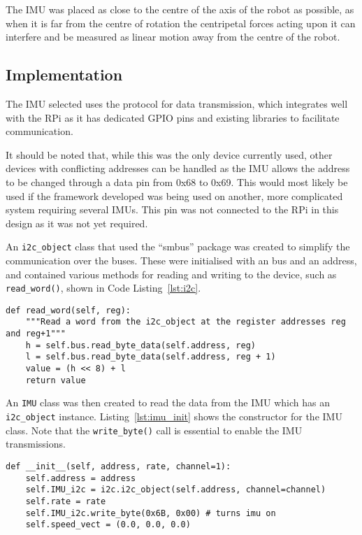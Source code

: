 The IMU was placed as close to the centre of the axis of the robot
as possible, as when it is far from the centre of rotation the centripetal
forces acting upon it can interfere and be measured as linear motion away
from the centre of the robot.

\subsection{Implementation}\label{elec/imu/impl}
The IMU selected uses the \isc{} protocol for data transmission, which
integrates well with the RPi as it has dedicated \isc{} GPIO pins and
existing libraries to facilitate communication.

It should be noted that, while this was the only \isc{} device currently
used, other devices with conflicting addresses can be handled as the IMU
allows the address to be changed through a data pin from 0x68 to 0x69.
This would most likely be used if the framework developed was being used
on another, more complicated system requiring several IMUs. This pin was
not connected to the RPi in this design as it was not yet required.

An \verb|i2c_object| class that used the ``smbus'' package was created to
simplify the communication over the \isc{} buses. These
were initialised with an \isc{} bus and an address, and
contained various methods for reading and writing to the \isc{} device,
such as \verb|read_word()|, shown in Code Listing~\ref{lst:i2c}.

\begin{lstlisting}[caption={I2C \texttt{read\_word()} function}, label={lst:i2c}]
def read_word(self, reg):
    """Read a word from the i2c_object at the register addresses reg and reg+1"""
    h = self.bus.read_byte_data(self.address, reg)
    l = self.bus.read_byte_data(self.address, reg + 1)
    value = (h << 8) + l
    return value
\end{lstlisting}

An \verb|IMU| class was then created to read the data from the IMU which
has an \verb|i2c_object| instance. Listing~\ref{lst:imu_init} shows
the constructor for the IMU class. Note that the \verb|write_byte()| call
is essential to enable the IMU transmissions.

\begin{lstlisting}[caption={IMU Initialisation Function}, label={lst:imu_init}]
def __init__(self, address, rate, channel=1):
    self.address = address
    self.IMU_i2c = i2c.i2c_object(self.address, channel=channel)
    self.rate = rate
    self.IMU_i2c.write_byte(0x6B, 0x00) # turns imu on
    self.speed_vect = (0.0, 0.0, 0.0)
\end{lstlisting}


